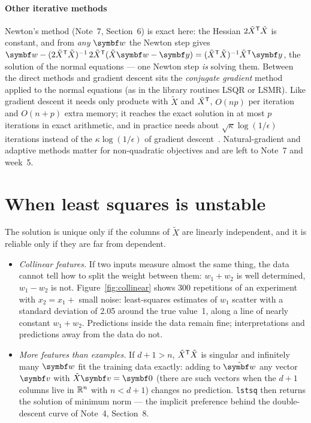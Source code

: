 \documentclass[11pt]{article}
\newcommand{\Xt}{\tilde X}
\newcommand{\w}{\vect{w}}
\newcommand{\y}{\vect{y}}
\begin{document}
\paragraph{Other iterative methods} Newton's method (Note~7, Section~6) is exact here: the Hessian $2\Xt\T\Xt$ is
constant, and from \emph{any} $\w$ the Newton step gives
$\w - (2\Xt\T\Xt)^{-1}\,2\Xt\T(\Xt\w - \y) = (\Xt\T\Xt)^{-1}\Xt\T\y$, the solution of the normal equations --- one Newton
step \emph{is} solving them. Between the direct methods and gradient descent sits the \emph{conjugate gradient} method
applied to the normal equations (as in the library routines LSQR or LSMR). Like gradient descent it needs only products
with $\Xt$ and $\Xt\T$, $O(np)$ per iteration and $O(n + p)$ extra memory; it reaches the exact solution in at most $p$
iterations in exact arithmetic, and in practice needs about $\sqrt{\kappa}\log(1/\epsilon)$ iterations instead of the
$\kappa\log(1/\epsilon)$ of gradient descent~\cite{nocedal2006}. Natural-gradient and adaptive methods matter for
non-quadratic objectives and are left to Note~7 and week~5.

\section{When least squares is unstable}\label{sec:unstable}

The solution is unique only if the columns of $\Xt$ are linearly independent, and it is reliable only if they are far
from dependent.

\begin{itemize}
\item \emph{Collinear features.} If two inputs measure almost the same thing, the data cannot tell how to split the
weight between them: $w_1 + w_2$ is well determined, $w_1 - w_2$ is not. Figure~\ref{fig:collinear} shows 300 repetitions
of an experiment with $x_2 = x_1 + $ small noise: least-squares estimates of $w_1$ scatter with a standard deviation of
2.05 around the true value~1, along a line of nearly constant $w_1 + w_2$. Predictions inside the data remain fine;
interpretations and predictions away from the data do not.
\item \emph{More features than examples.} If $d + 1 > n$, $\Xt\T\Xt$ is singular and infinitely many $\w$ fit the training
data exactly: adding to $\hat{\w}$ any vector $\vect{v}$ with $\Xt\vect{v} = \vect{0}$ (there are such vectors when the
$d+1$ columns live in $\mathbb{R}^n$ with $n < d + 1$) changes no prediction. \texttt{lstsq} then returns the solution of minimum
norm --- the implicit preference behind the double-descent curve of Note~4, Section~8.
\end{itemize}
\end{document}
